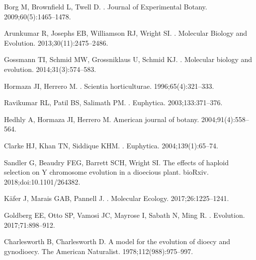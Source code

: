 \documentclass[10pt,letterpaper]{article}
\begin{document}
\begin{thebibliography}{100}
Borg M, Brownfield L, Twell D.
.
\newblock Journal of Experimental Botany. 2009;60(5):1465--1478.

Arunkumar R, Josephs EB, Williamson RJ, Wright SI.
.
\newblock Molecular Biology and Evolution. 2013;30(11):2475--2486.

Gossmann TI, Schmid MW, Grossniklaus U, Schmid KJ.
.
\newblock Molecular biology and evolution. 2014;31(3):574--583.

Hormaza JI, Herrero M.
.
\newblock Scientia horticulturae. 1996;65(4):321--333.

Ravikumar RL, Patil BS, Salimath PM.
.
\newblock Euphytica. 2003;133:371--376.

Hedhly A, Hormaza JI, Herrero M.
\newblock American journal of botany. 2004;91(4):558--564.

Clarke HJ, Khan TN, Siddique KHM.
.
\newblock Euphytica. 2004;139(1):65--74.

Sandler G, Beaudry FEG, Barrett SCH, Wright SI.
\newblock The effects of haploid selection on Y chromosome evolution in a
  dioecious plant.
\newblock bioRxiv. 2018;doi:{10.1101/264382}.

K{\"a}fer J, Marais GAB, Pannell J.
.
\newblock Molecular Ecology. 2017;26:1225--1241.

Goldberg EE, Otto SP, Vamosi JC, Mayrose I, Sabath N, Ming R.
.
\newblock Evolution. 2017;71:898--912.

Charlesworth B, Charlesworth D.
\newblock A model for the evolution of dioecy and gynodioecy.
\newblock The American Naturalist. 1978;112(988):975--997.


\end{thebibliography}
\end{document}
